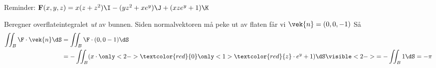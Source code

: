 \begin{frame}
  Reminder:
  $
    \mathbf{F}(x,y,z)
    = x(z+z^2)\I - (yz^2 + xe^y)\J + (xze^y + 1)\K
    $ \\ \medskip
    
    Beregner overflateintegralet \emph{ut} av bunnen. Siden normalvektoren må peke ut av flaten får vi $\vek{n} = (0,0,-1)$ Så 
    \begin{align*}
        \iint_{B} \F \cdot \vek{n} \dS
        & =  \iint_{B} \F \cdot (0,0-1)\dS  \\
        & = -\iint_{B} (x \cdot \only<2->{\textcolor{red}{0}}\only<1>{\textcolor{red}{z}} \cdot e^{y} + 1) \dS \visible<2->{
        = -\iint_{B} 1 \dS
        = - \pi}
    \end{align*}
\end{frame}

